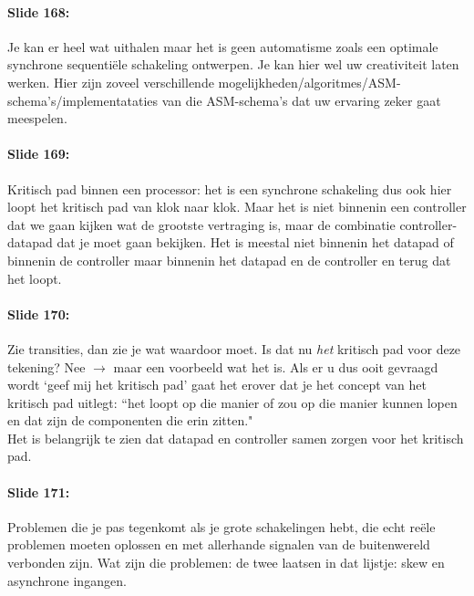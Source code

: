 \documentclass[10pt,a4paper]{book}
\begin{document}
\paragraph{Slide 168:} Je kan er heel wat uithalen maar het is geen automatisme zoals een optimale synchrone sequenti\"ele schakeling ontwerpen. Je kan hier wel uw creativiteit laten werken. Hier zijn zoveel verschillende mogelijkheden/algoritmes/ASM-schema's/implementataties van die ASM-schema's dat uw ervaring zeker gaat meespelen.

\paragraph{Slide 169:} Kritisch pad binnen een processor: het is een synchrone schakeling dus ook hier loopt het kritisch pad van klok naar klok. Maar het is niet binnenin een controller dat we gaan kijken wat de grootste vertraging is, maar de combinatie controller-datapad dat je moet gaan bekijken. Het is meestal niet binnenin het datapad of binnenin de controller maar binnenin het datapad en de controller en terug dat het loopt. 

\paragraph{Slide 170:} Zie transities, dan zie je wat waardoor moet. Is dat nu \emph{het} kritisch pad voor deze tekening? Nee $\rightarrow$ maar een voorbeeld wat het is. Als er u dus ooit gevraagd wordt `geef mij het kritisch pad' gaat het erover dat je het concept van het kritisch pad uitlegt: ``het loopt op die manier of zou op die manier kunnen lopen en dat zijn de componenten die erin zitten."\\
Het is belangrijk te zien dat datapad en controller samen zorgen voor het kritisch pad.

\paragraph{Slide 171:} Problemen die je pas tegenkomt als je grote schakelingen hebt, die echt re\"ele problemen moeten oplossen en met allerhande signalen van de buitenwereld verbonden zijn. Wat zijn die problemen: de twee laatsen in dat lijstje: skew en asynchrone ingangen.
\end{document}
